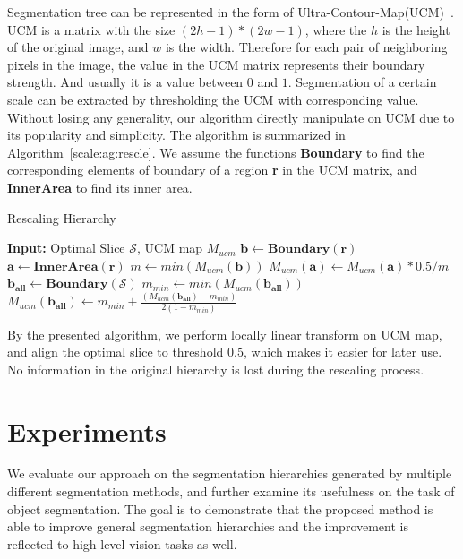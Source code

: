 Segmentation tree can be represented in the form of
Ultra-Contour-Map(UCM)~\citep{arbelaez2011contour}. UCM is a matrix
with the size $(2h-1)*(2w-1)$, where the $h$ is the height of the
original image, and $w$ is the width. Therefore for each pair of
neighboring pixels in the image, the value in the UCM matrix
represents their boundary strength. And usually it is a value between
$0$ and $1$. Segmentation of a certain scale can be extracted by
thresholding the UCM with corresponding value. Without losing any
generality, our algorithm directly manipulate on UCM due to its
popularity and simplicity. The algorithm is summarized in
Algorithm~\ref{scale:ag:rescle}. We assume the functions \textbf{Boundary}
to find the corresponding elements of boundary of a region \textbf{r}
in the UCM matrix, and \textbf{InnerArea} to find its inner area.

\begin{algorithm} [tb]
\caption{Rescaling Hierarchy}
\label{scale:ag:rescle}
\begin{algorithmic}
\STATE \textbf{Input:} Optimal Slice $\mathcal{S}$, UCM map $M_{ucm}$
\STATE $\textbf{b} \gets \textbf{Boundary}(\textbf{r})$
\STATE $\textbf{a} \gets \textbf{InnerArea}(\textbf{r})$
\STATE $m \gets min(M_{ucm}(\textbf{b}))$
\STATE $M_{ucm}(\textbf{a}) \gets M_{ucm}(\textbf{a})*0.5/m$
\ENDFOR
\STATE $ \textbf{b}_{\textbf{all}} \gets \textbf{Boundary}(\mathcal{S})$
\STATE $m_{min} \gets min(M_{ucm}(\textbf{b}_{\textbf{all}}))$
\STATE $M_{ucm}(\textbf{b}_{\textbf{all}}) \gets m_{min} + \frac{(M_{ucm}(\textbf{b}_{\textbf{all}})-m_{min})}{2(1-m_{min})}$
\end{algorithmic}
\end{algorithm}

By the presented algorithm, we perform locally linear transform on UCM map, and align the optimal slice to threshold $0.5$, which makes it easier for later use. No information in the original hierarchy is lost during the rescaling process. 




\section{Experiments}
\label{scale:sec:experiments}
We evaluate our approach on the segmentation hierarchies generated by
multiple different segmentation methods, and further examine its
usefulness on the task of object segmentation. The goal is to
demonstrate that the proposed method is able to improve general
segmentation hierarchies and the improvement is reflected to
high-level vision tasks as well.

